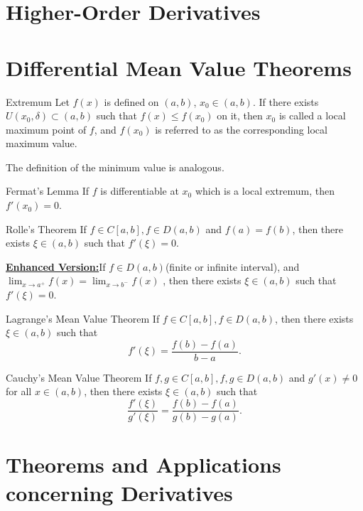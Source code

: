 \documentclass[11pt]{../../TexTemplate/elegantbook}
\begin{document}
\section{Higher-Order Derivatives}

\section{Differential Mean Value Theorems}
\begin{definition}{Extremum}
    Let \(f(x)\) is defined on \((a,b)\), \(x_{0}\in (a,b)\).
    If there exists \(U(x_{0}, \delta)\subset (a,b)\) such that \(f(x)\leqslant f(x_{0})\) on it,
    then \(x_{0}\) is called a local maximum point of \(f\),
    and \(f(x_{0})\) is referred to as the corresponding local maximum value.

    The definition of the minimum value is analogous.
\end{definition}

\begin{lemma}{Fermat's Lemma}
    If \(f\) is differentiable at \(x_{0}\) which is a local extremum, then \(f'(x_{0}) = 0\).
\end{lemma}

\begin{theorem}{Rolle's Theorem}
    If \(f\in C[a,b], f\in D(a,b)\) and \(f(a) = f(b)\), then there exists \(\xi\in (a,b)\) such that \(f'(\xi) = 0\).

    \underline{\textbf{Enhanced Version:}}If \(f\in D(a,b)\)(finite or infinite interval), 
    and \(\lim_{x \to a^{+}} f(x) = \lim_{x \to b^{-}} f(x) \) , 
    then there exists \(\xi\in (a,b)\) such that \(f'(\xi) = 0\).
\end{theorem}

\begin{theorem}{Lagrange's Mean Value Theorem}
    If \(f\in C[a,b], f\in D(a,b)\), then there exists \(\xi\in (a,b)\) such that
    \[
        f'(\xi) = \frac{f(b) - f(a)}{b - a}.
    \]
\end{theorem}

\begin{theorem}{Cauchy's Mean Value Theorem}
    If \(f,g\in C[a,b], f,g\in D(a,b)\) and \(g'(x) \neq 0\) for all \(x\in (a,b)\), 
    then there exists \(\xi\in (a,b)\) such that
    \[
        \frac{f'(\xi)}{g'(\xi)} = \frac{f(b) - f(a)}{g(b) - g(a)}.
    \]
\end{theorem}



\section{Theorems and Applications concerning Derivatives}
\end{document}
